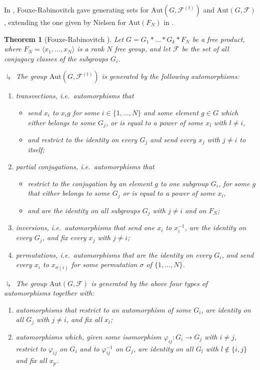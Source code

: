 \documentclass[a4paper,english,11pt]{article}
\newtheorem{theo}[de]{Theorem}
\theoremstyle{definition}
\theoremstyle{remark}
\newcommand{\Aut}{\mathrm{Aut}}
\newcommand{\calf}{\mathcal{F}}
\begin{document}
In \cite{FR}, Fouxe-Rabinovitch gave generating sets for $\Aut(G,\calf^{(t)})$ and $\Aut(G,\calf)$, extending the one given by Nielsen for $\Aut(F_N)$ in \cite{Nie}.

\begin{theo}[{Fouxe-Rabinovitch \cite{FR}}]\label{theo:FR}
Let $G=G_1\ast\dots\ast G_k\ast F_N$ be a free product, where $F_N=\langle x_1,\dots,x_N\rangle$ is a rank $N$ free group, and let $\calf$ be the set of all conjugacy classes of the subgroups $G_i$. 

\noindent $\drsh$ The group $\Aut(G,\calf^{(t)})$ is generated by the following automorphisms:
\begin{enumerate}
    \item \emph{transvections}, i.e.\ automorphisms that 
    \begin{itemize}
    \item send $x_i$ to $x_ig$ for some $i\in\{1,\dots,N\}$ and some element $g\in G$ which either belongs to some $G_j$, or is equal to a power of some $x_l$ with $l\neq i$, 
    \item and restrict to the identity on every $G_j$ and send every $x_j$ with $j\neq i$ to itself;
    \end{itemize}
    \item \emph{partial conjugations}, i.e.\ automorphisms that 
    \begin{itemize}
    \item restrict to the conjugation by an element $g$ to one subgroup $G_i$, for some $g$ that either belongs to some $G_j$ or is equal to a power of some $x_l$,
    \item and are the identity on all  subgroups $G_j$ with $j\neq i$ and on $F_N$;
    \end{itemize}
    \item \emph{inversions}, i.e.\ automorphisms that send one $x_i$ to $x_i^{-1}$, are the identity on every $G_j$, and fix every $x_j$ with $j\neq i$;
    \item \emph{permutations}, i.e.\ automorphisms that are the identity on every $G_i$, and send every $x_i$ to $x_{\sigma(i)}$ for some permutation $\sigma$ of $\{1,\dots,N\}$.
\end{enumerate}
$\drsh$ The group $\Aut(G,\calf)$ is generated by the above four types of automorphisms together with:
\begin{enumerate}
    \item[5.] automorphisms that restrict to an automorphism of some $G_i$, are identity on all $G_j$ with $j\neq i$, and fix all $x_l$;
    \item[6.] automorphisms which, given some isomorphism $\varphi_{ij}:G_i\to G_j$ with $i\neq j$, restrict to $\varphi_{ij}$ on $G_i$ and to $\varphi_{ij}^{-1}$ on $G_j$, are identity on all $G_l$ with $l\notin\{i,j\}$ and fix all $x_p$.
\end{enumerate}
\end{theo}
\end{document}
